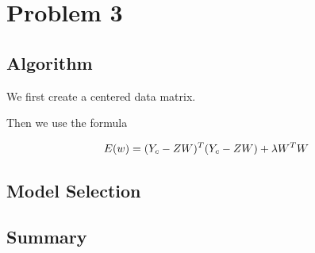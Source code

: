 \section{Problem 3}

\subsection{Algorithm}

We first create a centered data matrix. 

Then we use the formula

\begin{equation}
  E(w)= (Y_{c} - ZW)^T(Y_{c}-ZW) + \lambda W^TW \\
\end{equation}


\subsection{Model Selection}

\subsection{Summary}
